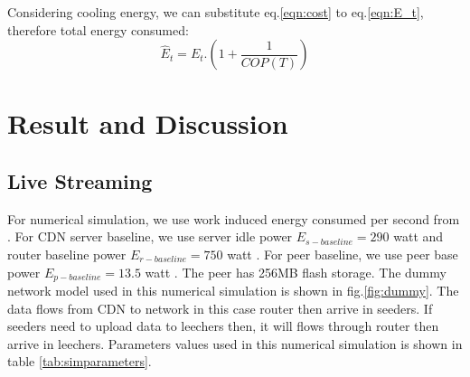 \documentclass[conference]{IEEEtran}
\begin{document}
Considering cooling energy, we can substitute eq.\ref{eqn:cost} to eq.\ref{eqn:E_t}, therefore total energy consumed: 
\begin{equation}
	\hat{E}_{t} = E_{t}.\left( 1+\frac{1}{COP(T)} \right)
\end{equation}




\section{Result and Discussion}\label{analysis}
\subsection{Live Streaming}
For numerical simulation, we use work induced energy consumed per second from \cite{Nedevschi:2008:HDC:1855610.1855618}.
For CDN server baseline, we use server idle power $E_{s-baseline}=290$ watt and router baseline power $E_{r-baseline}=750$ watt \cite{Nedevschi:2008:HDC:1855610.1855618}. 
For peer baseline, we use peer base power $E_{p-baseline}=13.5$ watt \cite{valancius2009greening}.
The peer has 256MB flash storage.
The dummy network model used in this numerical simulation is shown in fig.\ref{fig:dummy}.
The data flows from CDN to network in this case router then arrive in seeders. 
If seeders need to upload data to leechers then, it will flows through router then arrive in leechers. 
Parameters values used in this numerical simulation is shown in table \ref{tab:simparameters}.
\end{document}
